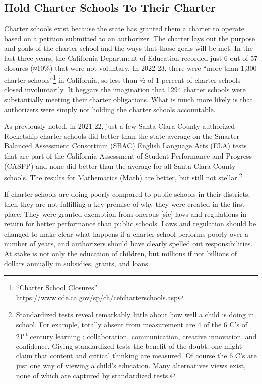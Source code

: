 \subsection{Hold Charter Schools To Their Charter}%
\label{sec:hold-charter-schools}\indent

Charter schools exist because the state has granted them a charter to operate based on a petition submitted to an authorizer. The charter lays out the purpose and goals of the charter school and the ways that those goals will be met. In the last three years, the California Department of Education  recorded just 6 out of 57 closures (≈10\%) that were not voluntary. In 2022-23, there were ``more than 1,300 charter schools''\footnote{``Charter School Closures'' \url{https://www.cde.ca.gov/sp/ch/cefcharterschools.asp}} in California, so less than ½ of 1 percent of charter schools closed involuntarily. It beggars the imagination that 1294 charter schools were substantially meeting their charter obligations. What is much more likely is that authorizers were simply not holding the charter schools accountable.

As previously noted, in 2021-22, just a few Santa Clara County authorized Rocketship charter schools did better than the state average on the Smarter Balanced Assessment Consortium (SBAC) English Language Arts (ELA) tests that are part of the California Assessment of Student Performance and Progress (CASPP) and none did better than the average for all Santa Clara County schools. The results for Mathematics (Math) are better, but still not stellar.\footnote{Standardized tests reveal remarkably little about how well a child is doing in school. For example, totally absent from measurement are 4 of the 6 C's of 21\textsuperscript{st}  century learning \parencite{Hirsh-Pasek.etal2020}: collaboration, communication, creative innovation, and confidence. Giving standardized tests the benefit of the doubt, one might claim that content and critical thinking are measured. Of course the 6 C's are just one way of viewing a child's education. Many alternatives views exist, none of which are captured by standardized tests.}

If charter schools are doing poorly compared to public schools in their districts, then they are not fulfilling a key premise of why they were created in the first place: They were granted exemption from onerous [sic] laws and regulations in return for better performance than public schools. Laws and regulation should be changed to make clear what happens if a charter school performs poorly over a number of years, and authorizers should have clearly spelled out responsibilities. At stake is not only the education of children, but millions if not billions of dollars annually in subsidies, grants, and loans.

